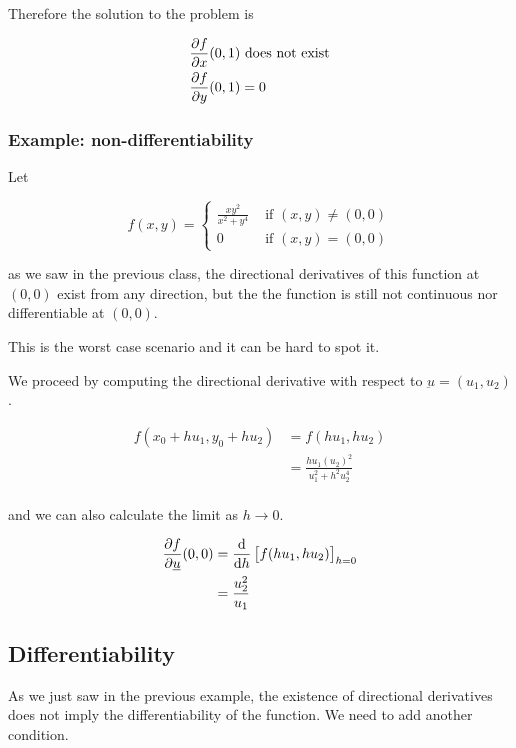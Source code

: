 \documentclass[10pt]{extarticle}
\newcommand{\munderbar}[1]{\underbar{\ensuremath{#1}}}
\begin{document}
Therefore the solution to the problem is

\begin{align*}
    \pdv{f}{x}()(0, 1) & \text{ does not exist} \\
    \pdv{f}{y}()(0, 1) & = 0
\end{align*}

\subsubsection{Example: non-differentiability}

Let

$$
    f(x, y) = \begin{cases}
        \frac{x y^2}{x^2 + y^4} & \text{ if } (x, y) \neq (0, 0) \\
        0                       & \text{ if } (x, y) = (0, 0)
    \end{cases}
$$

as we saw in the previous class, the directional derivatives of this function at $(0, 0)$ exist from any direction, but the the function is still not continuous nor differentiable at $(0, 0)$.

This is the worst case scenario and it can be hard to spot it.

We proceed by computing the directional derivative with respect to $\munderbar{u} = (u_1, u_2)$.

\begin{align*}
    f(x_0 + hu_1, y_0 + hu_2) & = f(hu_1, hu_2)                         \\
                              & = \frac{hu_1(u_2)^2}{u_1^2 + h^2 u_2^4} \\
\end{align*}

and we can also calculate the limit as $h \to 0$.

\begin{align*}
    \pdv{f}{\munderbar{u}}()(0, 0) & = \dv{h} \left[ f(hu_1, hu_2) \right]_{h = 0} \\
                                   & = \frac{u_2^2}{u_1}                           \\
\end{align*}

\subsection{Differentiability}

As we just saw in the previous example, the existence of directional derivatives does not imply the differentiability of the function.
We need to add another condition.
\end{document}
